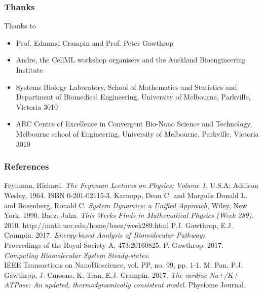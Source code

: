 \documentclass[11pt,reqno]{beamer}
\begin{document}
\begin{frame}
\frametitle{Thanks}
{\small
Thanks to
\begin{itemize}
		\itemsep1em
	\item Prof. Edmund Crampin and Prof. Peter Gawthrop
	\item Andre, the CellML workshop organisers and the Auckland Bioengineering Institute
\item Systems Biology Laboratory, School of Mathematics and Statistics and Department of Biomedical Engineering, University of Melbourne, Parkville, Victoria 3010
\item ARC Centre of Excellence in Convergent Bio-Nano Science and Technology,
Melbourne school of Engineering, 
University of Melbourne, Parkville, Victoria 3010
\end{itemize}
}

\end{frame}

\begin{frame}
\frametitle{References}
{\tiny
	\begin{thebibliography}{6}
		 Feynman, Richard. \emph{The Feynman Lectures on Physics; Volume 1.} U.S.A: Addison Wesley, 1964. ISBN 0-201-02115-3.
		 Karnopp, Dean C. and Margolis Donald L. and Rosenberg, Ronald C. \emph{System Dynamics: a Unified Approach}, Wiley, New York, 1990.
		 Baez, John. \emph{This Weeks Finds in Mathematical Physics (Week 289).} 2010.  http://math.ucr.edu/home/baez/week289.html 
		  P.J. Gawthrop, E.J. Crampin. 2017. \emph{Energy-based Analysis of Biomolecular Pathways}\\
		Proceedings of the Royal Society A, 473:20160825.
		 P. Gawthrop. 2017. \emph{Computing Biomolecular System Steady-states.}\\
		IEEE Transactions on NanoBioscience, vol. PP, no. 99, pp. 1-1. 
		 M. Pan, P.J. Gawthrop, J. Cursons, K. Tran, E.J. Crampin. 2017.
			\emph{The cardiac Na+/K+ ATPase: An updated, thermodynamically consistent model}.
			Physiome Journal.
			
\end{thebibliography}}
\end{frame}
\end{document}
